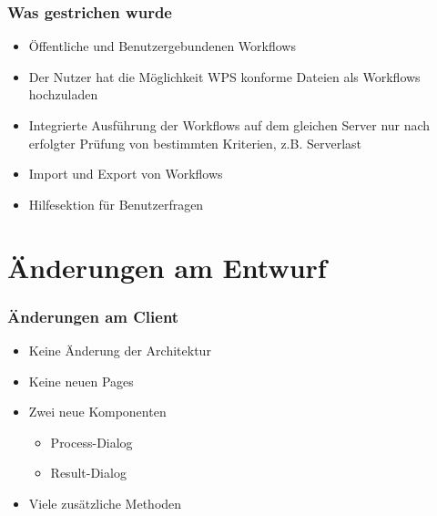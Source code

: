 \documentclass[11pt, usepdftitle=false,...]{beamer}
\begin{document}
			\begin{frame}
				\frametitle{Was gestrichen wurde}
				\begin{itemize}
				   	\item<2-> Öffentliche und Benutzergebundenen Workflows
				    \item<3-> Der Nutzer hat die Möglichkeit WPS konforme Dateien als Workflows hochzuladen
				    
				    \item<4-> Integrierte Ausführung der Workflows auf dem gleichen Server nur nach erfolgter Prüfung von bestimmten Kriterien, z.B. Serverlast
				    \item<5-> Import und Export von Workflows
				    \item<6-> Hilfesektion für Benutzerfragen	
				\end{itemize}	
			\end{frame}
			
	\section{Änderungen am Entwurf}	
	\frame{\sectionpage}
	
    	\begin{frame}
    		\frametitle{Änderungen am Client}
    		\begin{itemize}
    		    \item<2-> Keine Änderung der Architektur
    		    \item<3-> Keine neuen Pages
    		   	\item<4-> Zwei neue Komponenten
    		   	\begin{itemize}
    		   		\item<5-> Process-Dialog
    		    	\item<6-> Result-Dialog
    		    \end{itemize}
    		    \item<7-> Viele zusätzliche Methoden
    		\end{itemize}	
    	\end{frame}
    	
\end{document}
